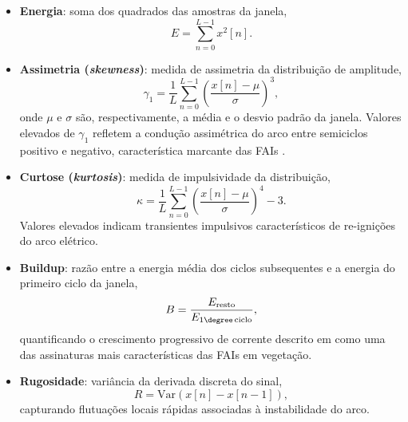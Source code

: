 \begin{itemize}
    \item \textbf{Energia}: soma dos quadrados das amostras da janela,
    \begin{equation}
        E = \sum_{n=0}^{L-1} x^2[n].
        \label{eq:energy}
    \end{equation}

    \item \textbf{Assimetria (\textit{skewness})}: medida de assimetria da distribuição de amplitude,
    \begin{equation}
        \gamma_1 = \frac{1}{L} \sum_{n=0}^{L-1} \left(\frac{x[n] - \mu}{\sigma}\right)^3,
        \label{eq:skewness}
    \end{equation}
    onde $\mu$ e $\sigma$ são, respectivamente, a média e o desvio padrão da janela. Valores elevados de $\gamma_1$ refletem a condução assimétrica do arco entre semiciclos positivo e negativo, característica marcante das FAIs \cite{4}.

    \item \textbf{Curtose (\textit{kurtosis})}: medida de impulsividade da distribuição,
    \begin{equation}
        \kappa = \frac{1}{L} \sum_{n=0}^{L-1} \left(\frac{x[n] - \mu}{\sigma}\right)^4 - 3.
        \label{eq:kurtosis}
    \end{equation}
    Valores elevados indicam transientes impulsivos característicos de re-ignições do arco elétrico.

    \item \textbf{Buildup}: razão entre a energia média dos ciclos subsequentes e a energia do primeiro ciclo da janela,
    \begin{equation}
        B = \frac{E_{\mathrm{resto}}}{E_{1\degree\,\mathrm{ciclo}}},
        \label{eq:buildup}
    \end{equation}
    quantificando o crescimento progressivo de corrente descrito em  como uma das assinaturas mais características das FAIs em vegetação.

    \item \textbf{Rugosidade}: variância da derivada discreta do sinal,
    \begin{equation}
        R = \mathrm{Var}\!\left(x[n] - x[n-1]\right),
        \label{eq:roughness}
    \end{equation}
    capturando flutuações locais rápidas associadas à instabilidade do arco.
\end{itemize}

